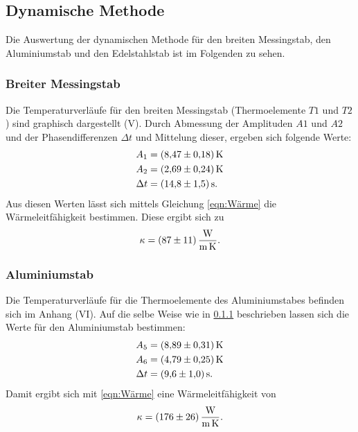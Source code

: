 \subsection{Dynamische Methode}
Die Auswertung der dynamischen Methode für den breiten Messingstab, 
den Aluminiumstab und den Edelstahlstab ist im Folgenden zu sehen.
\subsubsection{Breiter Messingstab}
\label{sec:messing}




Die Temperaturverläufe für den breiten Messingstab (Thermoelemente $T1$ und $T2$)
sind graphisch dargestellt (V).
\newline
Durch Abmessung der Amplituden $A1$ und $A2$ und der Phasendifferenzen $\Delta t$ 
und Mittelung dieser, ergeben sich folgende Werte:
\begin{align*}
    A_{1} &= \SI{8.47 \pm 0.18}{\kelvin} \\
    A_{2} &= \SI{2.69 \pm 0.24}{\kelvin} \\
    \Delta t &= \SI{14.8 \pm 1.5}{\second}.
\end{align*}
Aus diesen Werten lässt sich mittels Gleichung \eqref{eqn:Wärme} die Wärmeleitfähigkeit
bestimmen. Diese ergibt sich zu
\begin{equation*}
    \kappa = \SI{87 \pm 11}{\watt\per\meter\per\kelvin}.
\end{equation*}

\subsubsection{Aluminiumstab}




Die Temperaturverläufe für die Thermoelemente des Aluminiumstabes befinden sich im Anhang (VI).
Auf die selbe Weise wie in \ref{sec:messing} beschrieben lassen sich die Werte
für den Aluminiumstab bestimmen:
\begin{align*}
    A_{5} &= \SI{8.89 \pm 0.31}{\kelvin} \\
    A_{6} &= \SI{4.79 \pm 0.25}{\kelvin} \\
    \Delta t &= \SI{9.6 \pm 1.0}{\second}.
\end{align*}
Damit ergibt sich mit \eqref{eqn:Wärme} eine Wärmeleitfähigkeit von
\begin{equation*}
    \kappa = \SI{176 \pm 26}{\watt\per\meter\per\kelvin}.
\end{equation*}

